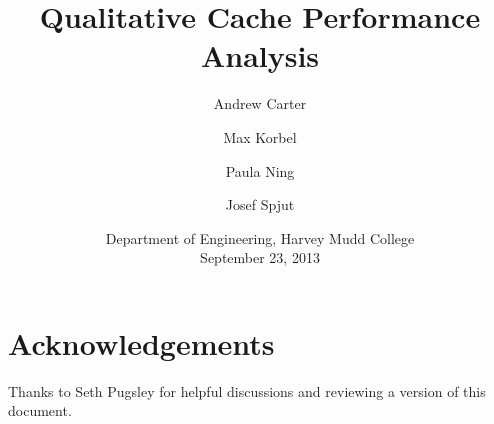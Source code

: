 \documentclass[pageno]{jpaper}
\begin{document}
\title{Qualitative Cache Performance Analysis}

\author{Andrew Carter \and Max Korbel \and Paula Ning \and Josef Spjut}
\date{Department of Engineering, Harvey Mudd College\\September 23, 2013}
\maketitle


\begin{abstract}

\end{abstract}









\section{Acknowledgements}
Thanks to Seth Pugsley for helpful discussions and reviewing a version of this document.



\end{document}
